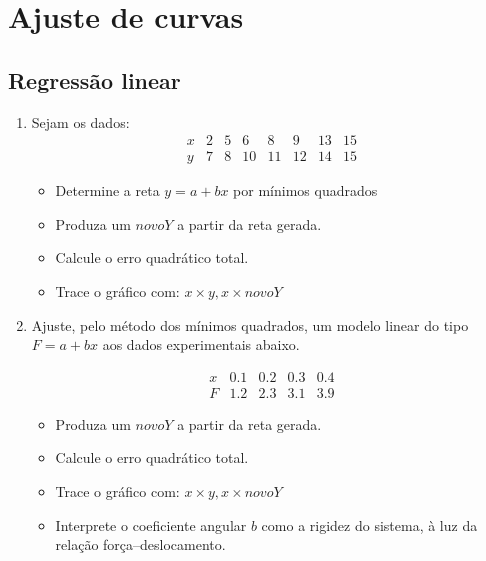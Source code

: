 \clearpage
\section{Ajuste de curvas} \label{sec:ajusteCurvas}

\subsection*{Regressão linear}
\begin{enumerate}[label=\thesection.\arabic*]

\item Sejam os dados:
\[
\begin{array}{c|ccccccc}
x & 2 & 5 & 6 & 8 & 9 & 13 & 15 \\
\hline
y & 7 & 8 & 10 & 11 & 12 & 14 & 15
\end{array}
\]
\begin{itemize}
    \item Determine a reta $y = a + bx$ por mínimos quadrados 
    \item Produza um $novoY$ a partir da reta gerada.
    \item Calcule o erro quadrático total.
    \item Trace o gráfico com: $ x \times y , x \times novoY$ 
\end{itemize}


\item Ajuste, pelo método dos mínimos quadrados, um modelo linear do tipo $F = a + bx$ aos dados experimentais abaixo. 


\[
    \begin{array}{c|cccc}
        x & 0.1 & 0.2 & 0.3 & 0.4 \\
        F & 1.2 & 2.3 & 3.1 & 3.9
    \end{array}
    \]
    
\begin{itemize}
    \item Produza um $novoY$ a partir da reta gerada.
    \item Calcule o erro quadrático total.
    \item Trace o gráfico com: $ x \times y , x \times novoY$ 
    \item Interprete o coeficiente angular $b$ como a rigidez do sistema, à luz da relação força--deslocamento.
\end{itemize}



\end{enumerate}
